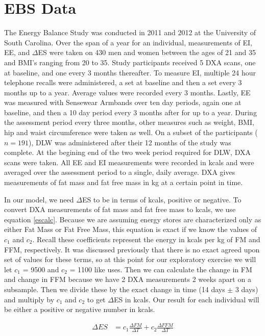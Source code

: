 \documentclass[11pt]{article}\usepackage[]{graphicx}\usepackage[]{color}
\begin{document}
\section{EBS Data}
The Energy Balance Study \cite{hand} was conducted in 2011 and 2012 at the University of South Carolina. Over the span of a year for an individual, measurements of EI, EE, and $\Delta$ES were taken on 430 men and women between the ages of 21 and 35 and BMI's ranging from 20 to 35. Study participants received 5 DXA scans, one at baseline, and one every 3 months thereafter. To measure EI, multiple 24 hour telephone recalls were administered, a set at baseline and then a set every 3 months up to a year. Average values were recorded every 3 months. Lastly, EE was measured with Sensewear Armbands over ten day periods, again one at baseline, and then a 10 day period every 3 months after for up to a year. During the assessment period every three months, other measures such as weight, BMI, hip and waist circumference were taken as well. On a subset of the participants ($n=191$), DLW was administered after their 12 months of the study was complete. At the begining end of the two week period required for DLW, DXA scans were taken. All EE and EI measurements were recorded in kcals and were averaged over the assessment period to a single, daily average. DXA gives measurements of fat mass and fat free mass in kg at a certain point in time. 

In our model, we need $\Delta$ES to be in terms of kcals, positive or negative. To convert DXA measurements of fat mass and fat free mass to kcals, we use equation \eqref{escalc}. Because we are assuming energy stores are characterized only as either Fat Mass or Fat Free Mass, this equation is exact if we know the values of $c_1$ and $c_2$. Recall these coefficients represent the energy in kcals per kg of FM and FFM, respectively. It was discussed previously that there is no exact agreed upon set of values for these terms, so at this point for our exploratory exercise we will let $c_1$ = 9500 and $c_2$ = 1100 like \cite{thomas11} uses. Then we can calculate the change in FM and change in FFM because we have 2 DXA measurements 2 weeks apart on a subsample. Then we divide these by the exact change in time (14 days $\pm$ 3 days) and multiply by $c_1$ and $c_2$ to get $\Delta$ES in kcals. Our result for each individual will be either a positive or negative number in kcals.

\begin{align}
  \label{escalc}
  \Delta ES &= c_1 \frac{\Delta FM}{\Delta T} + c_2 \frac{\Delta FFM}{\Delta T}
\end{align}
\end{document}
